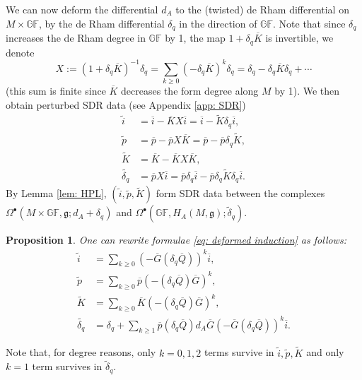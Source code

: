 \documentclass[11pt,a4paper]{amsart}
\theoremstyle{plain} %
\newtheorem{prop}[thm]{Proposition}
\theoremstyle{definition}
\theoremstyle{remark}
\newcommand{\g}{\mathfrak{g}}
\newcommand{\til}{\widetilde}
\newcommand{\Kb}{\overline{K}}
\newcommand{\ib}{\overline{i}}
\newcommand{\pb}{\overline{p}}
\newcommand{\Qb}{\overline{Q}}
\newcommand{\Gb}{\overline{G}}
\begin{document}
We can now deform the differential $d_A$ to the (twisted) de Rham differential on $M \times \mathbb{GF}$, by the de Rham differential $\delta_q$ in the direction of $\mathbb{GF}$. Note that since $\delta_q$ increases the de Rham degree in $\mathbb{GF}$ by 1, the map 
$1 + \delta_q  \Kb$ is invertible, we denote 
\begin{equation} X := (1 + \delta_q  \Kb)^{-1}  \delta_q = \sum_{k\geq 0}(-\delta_q  \Kb)^k \delta_q = \delta_q - \delta_q\Kb\delta_q + \cdots 
\end{equation} 
(this sum is finite since $\Kb$ decreases the form degree along $M$ by 1). 
We then obtain perturbed SDR data (see Appendix \ref{app: SDR})
\begin{equation}\label{eq: deformed induction}
    \begin{aligned}
        \widetilde{i} &=  \ib - \Kb X \ib = \ib - \widetilde{K}  \delta_q  \ib, \\
        \widetilde{p} &=  \pb - \pb X  \Kb = \pb - \pb  \delta_q  \widetilde{K},\\
        \widetilde{K} &=  \Kb - \Kb X  \Kb ,\\
        \widetilde{\delta_q} &= \pb X  \ib = \pb  \delta_q  \ib - \pb  \delta_q  \widetilde{K} \delta_q  \ib.
    \end{aligned}
\end{equation} 
By Lemma \ref{lem: HPL},  $(\widetilde{i},\widetilde{p},\widetilde{K})$ form SDR data between the complexes $\Omega^\bullet(M\times \mathbb{GF},\g;d_A + \delta_q)$ and $\Omega^\bullet(\mathbb{GF}, H_A(M,\g);\widetilde{\delta}_q).$ 
\begin{prop}\label{prop: extended ipK triple, App C}
    One can rewrite formulae \eqref{eq: deformed induction} as follows: 
    \begin{equation}\label{eq: deformed induction 2}
    \begin{aligned}
        \widetilde{i} &=  \sum_{k \geq 0} (-\Gb (\delta_q\Qb))^k \ib, \\
        \widetilde{p} &=  \sum_{k \geq 0}\pb(-(\delta_q\Qb)  \Gb)^k, \\
        \widetilde{K} &=  \sum_{k \geq 0} \Kb(-(\delta_q \Qb) \Gb)^k, \\
        \widetilde{\delta_q} &= \delta_q + \sum_{k \geq 1} \pb(\delta_q\Qb) d_A  \Gb  (-\Gb(\delta_q\Qb))^k \ib.
    \end{aligned}
\end{equation} 
\end{prop}
Note that, for degree reasons, only $k=0,1,2$ terms survive in $\til{i},\til{p},\til{K}$ and only $k=1$ term survives in $\til\delta_q$.
\end{document}
